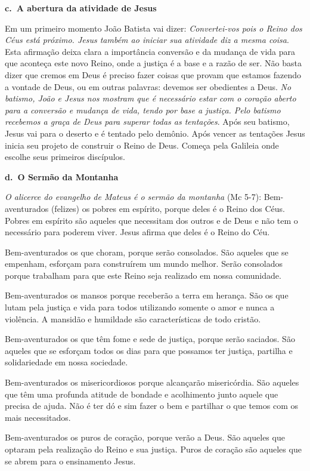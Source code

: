 \documentclass[
]{book}
\begin{document}
\textbf{c.~A abertura da atividade de Jesus}

Em um primeiro momento João Batista vai dizer: \emph{Convertei-vos pois o Reino dos Céus está próximo. Jesus também ao iniciar sua atividade diz a mesma coisa}. Esta afirmação deixa clara a importância conversão e da mudança de vida para que aconteça este novo Reino, onde a justiça é a base e a razão de ser. Não basta dizer que cremos em Deus é preciso fazer coisas que provam que estamos fazendo a vontade de Deus, ou em outras palavras: devemos ser obedientes a Deus. \emph{No batismo, João e Jesus nos mostram que é necessário estar com o coração aberto para a conversão e mudança de vida, tendo por base a justiça. Pelo batismo recebemos a graça de Deus para superar todas as tentações}. Após seu batismo, Jesus vai para o deserto e é tentado pelo demônio. Após vencer as tentações Jesus inicia seu projeto de construir o Reino de Deus. Começa pela Galileia onde escolhe seus primeiros discípulos.

\textbf{d.~O Sermão da Montanha}

\emph{O alicerce do evangelho de Mateus é o sermão da montanha} (Mc 5-7):
Bem-aventurados (felizes) os pobres em espírito, porque deles é o Reino dos Céus. Pobres em espírito são aqueles que necessitam dos outros e de Deus e não tem o necessário para poderem viver. Jesus afirma que deles é o Reino do Céu.

Bem-aventurados os que choram, porque serão consolados. São aqueles que se empenham, esforçam para construírem um mundo melhor. Serão consolados porque trabalham para que este Reino seja realizado em nossa comunidade.

Bem-aventurados os mansos porque receberão a terra em herança. São os que lutam pela justiça e vida para todos utilizando somente o amor e nunca a violência. A mansidão e humildade são características de todo cristão.

Bem-aventurados os que têm fome e sede de justiça, porque serão saciados. São aqueles que se esforçam todos os dias para que possamos ter justiça, partilha e solidariedade em nossa sociedade.

Bem-aventurados os misericordiosos porque alcançarão misericórdia. São aqueles que têm uma profunda atitude de bondade e acolhimento junto aquele que precisa de ajuda. Não é ter dó e sim fazer o bem e partilhar o que temos com os mais necessitados.

Bem-aventurados os puros de coração, porque verão a Deus. São aqueles que optaram pela realização do Reino e sua justiça. Puros de coração são aqueles que se abrem para o ensinamento Jesus.
\end{document}
